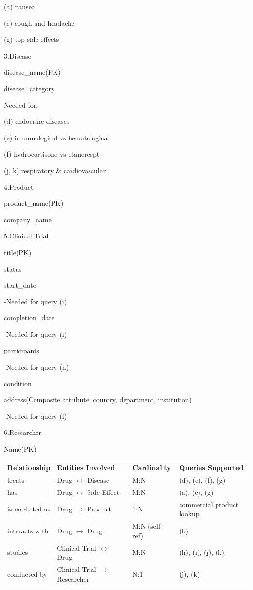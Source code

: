 \documentclass[12pt,a4paper]{article}
\begin{document}
(a) nausea\par
(c) cough and headache\par
(g) top side effects\par
3.Disease\par
disease\_name(PK)\par
disease\_category\par
Needed for:\par
(d) endocrine diseases\par
(e) immunological vs hematological\par
(f) hydrocortisone vs etanercept\par
(j, k) respiratory \& cardiovascular\par
4.Product\par
product\_name(PK)\par
company\_name\par
5.Clinical Trial\par
title(PK)\par
status\par
start\_date\par
-Needed for query (i)\par
completion\_date\par
-Needed for query (i)\par
participants\par
-Needed for query (h) \par
condition\par
address(Composite attribute: country, department, institution)\par 
-Needed for query (l)\par
6.Researcher\par
Name(PK)\par
\begin{table}[h]
\centering
\renewcommand{\arraystretch}{1.4}
\begin{tabular}{|l|l|l|l|}
\hline
\textbf{Relationship} & \textbf{Entities Involved} & \textbf{Cardinality} & \textbf{Queries Supported} \\
\hline
treats & Drug $\leftrightarrow$ Disease & M:N & (d), (e), (f), (g) \\
\hline
has & Drug $\leftrightarrow$ Side Effect & M:N & (a), (c), (g) \\
\hline
is marketed as & Drug $\rightarrow$ Product & 1:N & commercial product lookup \\
\hline
interacts with & Drug $\leftrightarrow$ Drug & M:N (self-ref) & (b) \\
\hline
studies & Clinical Trial $\leftrightarrow$ Drug & M:N & (h), (i), (j), (k) \\
\hline
conducted by & Clinical Trial $\rightarrow$ Researcher & N:1 & (j), (k) \\
\hline
\end{tabular}

\label{tab:relationships}
\end{table}
\end{document}
